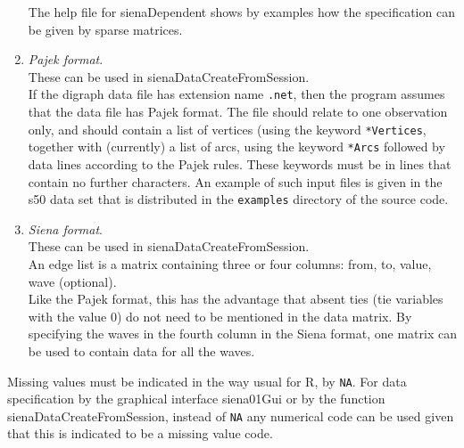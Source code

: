 \documentclass[a4paper,fleqn,11pt]{article}
\newcommand{\+}{\, + \,}
\newcommand{\sfn}[1]{\textsf{#1}}
\newcommand{\Rn}{{\sf R}}
\begin{document}
\begin{enumerate}
      The help file for \sfn{sienaDependent} shows by examples how the
      specification can be given by sparse matrices.
    \item \emph{Pajek format}.\\
      These can be used in \sfn{sienaDataCreateFromSession}.\\
      If the digraph data file has extension name \texttt{.net}, then the
      program assumes that the data file has Pajek format.
      The file should relate to one observation only,
      and should contain a list of vertices (using the
      keyword \texttt{*Vertices}, together with (currently) a list of arcs,
      using the keyword \texttt{*Arcs}
      followed by data lines according to the Pajek rules.
      These keywords must be in lines that contain no further characters.
      An example of such input files is given in the s50 data set
      that is distributed in the \texttt{examples} directory of the
      source code.
    \item \emph{Siena format}.\\
      These can be used in \sfn{sienaDataCreateFromSession}.\\
      An edge list is a matrix containing three or four columns:
      from, to, value, wave (optional).\\
      Like the Pajek format, this has the advantage that absent ties (tie
      variables with the value 0) do not need to be mentioned in the data
      matrix. By specifying the waves in the fourth column in the
      \sfn{Siena} format, one matrix can be used to contain data for all
      the waves.

\end{enumerate}

Missing values must be indicated in the way usual for \Rn,
by \texttt{NA}.
For data specification by the graphical interface \textsf{siena01Gui}
or by the function \textsf{sienaDataCreateFromSession},
instead of \texttt{NA} any numerical code can be used
given that this is indicated to be a missing value code.
\end{document}
